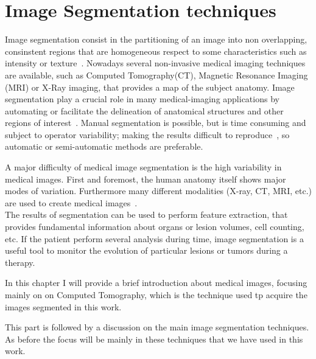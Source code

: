 \documentclass{standalone}
\begin{document}
	\chapter{Image Segmentation techniques}
	Image segmentation consist in the partitioning of an image into non overlapping, consinstent regions that are homogeneous respect to some characteristics such as intensity or texture~\cite{ART:Pham}.
	Nowadays several non-invasive medical imaging techniques are available, such as Computed Tomography(CT), Magnetic Resonance Imaging (MRI) or X-Ray imaging, that provides a map of the subject anatomy. Image segmentation play a crucial role in many medical-imaging applications by automating or facilitate the delineation of anatomical structures and other regions of interest~\cite{ART:Pham}.  Manual segmentation is  possible, but is time consuming and subject to operator variability; making the results difficult to reproduce~\cite{INP:Withey}, so automatic or semi-automatic methods are preferable. 
	
	A major difficulty of medical image segmentation is the high variability in medical images. First and foremost, the human anatomy itself shows major modes of variation. Furthermore many different modalities (X-ray, CT, MRI, etc.) are used to create medical images~\cite{ART:Pooja}.\\
	The results of segmentation can be used to perform feature extraction, that provides fundamental information about organs or lesion volumes, cell counting, etc. If the patient perform several analysis during time, image segmentation is a useful tool to monitor the evolution of particular lesions or tumors during a therapy.
	
	In this chapter I will provide a brief introduction about medical images, focusing mainly on on Computed Tomography, which is the technique used tp acquire the images segmented in this work. 
	
	This part is followed by a discussion on the main image segmentation techniques. As before the focus will be mainly in these techniques that we have used in this work.

	
\end{document}
